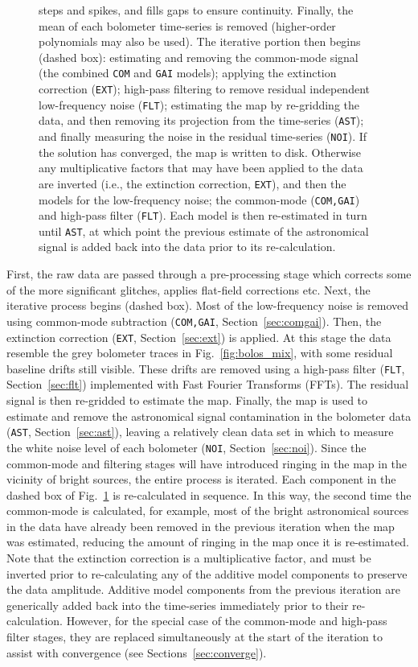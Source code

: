 \documentclass[useAMS,usenatbib,nofootinbib]{mn2e}
\newcommand{\model}[1]{\texttt{#1}}
\begin{document}
\begin{figure}
{  steps and spikes, and fills gaps to ensure continuity. Finally, the
  mean of each bolometer time-series is removed (higher-order
  polynomials may also be used). The iterative portion then begins
  (dashed box): estimating and removing the common-mode signal (the
  combined \model{COM} and \model{GAI} models); applying the
  extinction correction (\model{EXT}); high-pass filtering to remove
  residual independent low-frequency noise (\model{FLT}); estimating
  the map by re-gridding the data, and then removing its projection
  from the time-series (\model{AST}); and finally measuring the noise
  in the residual time-series (\model{NOI}). If the solution has
  converged, the map is written to disk. Otherwise any multiplicative
  factors that may have been applied to the data are inverted (i.e.,
  the extinction correction, \model{EXT}), and then the models for the
  low-frequency noise; the common-mode (\model{COM,GAI}) and high-pass
  filter (\model{FLT}). Each model is then re-estimated in turn until
  \model{AST}, at which point the previous estimate of the
  astronomical signal is added back into the data prior to its
  re-calculation.}
\label{fig:dimm}
\end{figure}

First, the raw data are passed through a pre-processing stage which
corrects some of the more significant glitches, applies flat-field
corrections etc. Next, the iterative process begins (dashed box). Most
of the low-frequency noise is removed using common-mode subtraction
(\model{COM,GAI}, Section~\ref{sec:comgai}). Then, the extinction
correction (\model{EXT}, Section~\ref{sec:ext}) is applied. At this
stage the data resemble the grey bolometer traces in
Fig.~\ref{fig:bolos_mix}, with some residual baseline drifts still
visible. These drifts are removed using a high-pass filter
(\model{FLT}, Section~\ref{sec:flt}) implemented with Fast Fourier
Transforms (FFTs). The residual signal is then re-gridded to estimate
the map. Finally, the map is used to estimate and remove the
astronomical signal contamination in the bolometer data (\model{AST},
Section~\ref{sec:ast}), leaving a relatively clean data set in which
to measure the white noise level of each bolometer (\model{NOI},
Section~\ref{sec:noi}). Since the common-mode and filtering stages
will have introduced ringing in the map in the vicinity of bright
sources, the entire process is iterated. Each component in the dashed
box of Fig.~\ref{fig:dimm} is re-calculated in sequence. In this way,
the second time the common-mode is calculated, for example, most of
the bright astronomical sources in the data have already been removed
in the previous iteration when the map was estimated, reducing the
amount of ringing in the map once it is re-estimated. Note that the
extinction correction is a multiplicative factor, and must be inverted
prior to re-calculating any of the additive model components to
preserve the data amplitude. Additive model components from the
previous iteration are generically added back into the time-series
immediately prior to their re-calculation. However, for the special
case of the common-mode and high-pass filter stages, they are replaced
simultaneously at the start of the iteration to assist with
convergence (see Sections~\ref{sec:converge}).
\end{document}
